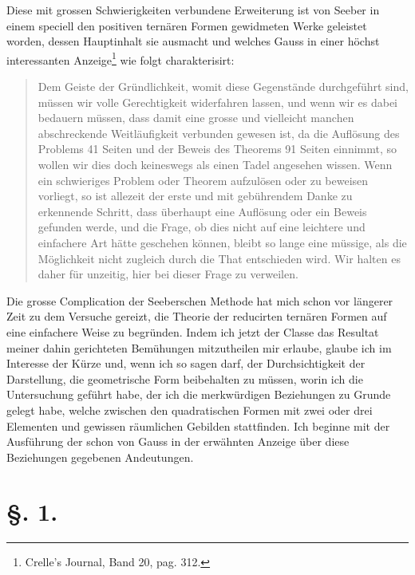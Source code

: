 \documentclass[11pt]{article}
\begin{document}
Diese mit grossen Schwierigkeiten verbundene Erweiterung ist von Seeber in einem speciell den positiven ternären Formen gewidmeten Werke geleistet worden, dessen Hauptinhalt sie ausmacht und welches Gauss in einer höchst interessanten Anzeige\footnote{Crelle's Journal, Band 20, pag. 312.} wie folgt charakterisirt:

\begin{quote}
Dem Geiste der Gründlichkeit, womit diese Gegenstände durchgeführt sind, müssen wir volle Gerechtigkeit widerfahren lassen, und wenn wir es dabei bedauern müssen, dass damit eine grosse und vielleicht manchen abschreckende Weitläufigkeit verbunden gewesen ist, da die Auflösung des Problems 41 Seiten und der Beweis des Theorems 91 Seiten einnimmt, so wollen wir dies doch keineswegs als einen Tadel angesehen wissen. Wenn ein schwieriges Problem oder Theorem aufzulösen oder zu beweisen vorliegt, so ist allezeit der erste und mit gebührendem Danke zu erkennende Schritt, dass überhaupt eine Auflösung oder ein Beweis gefunden werde, und die Frage, ob dies nicht auf eine leichtere und einfachere Art hätte geschehen können, bleibt so lange eine müssige, als die Möglichkeit nicht zugleich durch die That entschieden wird. Wir halten es daher für unzeitig, hier bei dieser Frage zu verweilen.
\end{quote}

Die grosse Complication der Seeberschen Methode hat mich schon vor längerer Zeit zu dem Versuche gereizt, die Theorie der reducirten ternären Formen auf eine einfachere Weise zu begründen. Indem ich jetzt der Classe das Resultat meiner dahin gerichteten Bemühungen mitzutheilen mir erlaube, glaube ich im Interesse der Kürze und, wenn ich so sagen darf, der Durchsichtigkeit der Darstellung, die geometrische Form beibehalten zu müssen, worin ich die Untersuchung geführt habe, der ich die merkwürdigen Beziehungen zu Grunde gelegt habe, welche zwischen den quadratischen Formen mit zwei oder drei Elementen und gewissen räumlichen Gebilden stattfinden. Ich beginne mit der Ausführung der schon von Gauss in der erwähnten Anzeige über diese Beziehungen gegebenen Andeutungen.

\section*{§. 1.}
\end{document}
